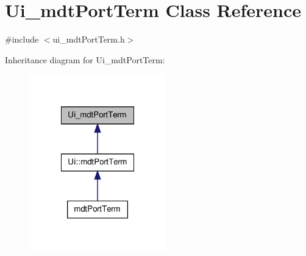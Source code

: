 \hypertarget{class_ui__mdt_port_term}{\section{Ui\-\_\-mdt\-Port\-Term Class Reference}
\label{class_ui__mdt_port_term}
}


{\ttfamily \#include $<$ui\-\_\-mdt\-Port\-Term.\-h$>$}



Inheritance diagram for Ui\-\_\-mdt\-Port\-Term\-:\nopagebreak
\begin{figure}[H]
\begin{center}
\leavevmode
\includegraphics[width=168pt]{class_ui__mdt_port_term__inherit__graph}
\end{center}
\end{figure}


